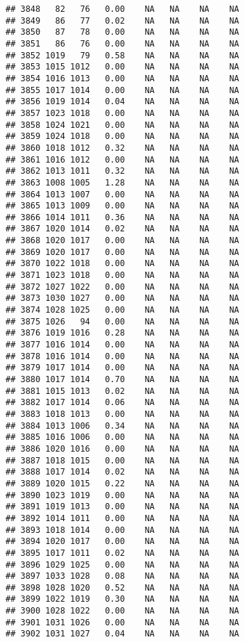 \documentclass{article}\usepackage{graphicx, color}
\makeatletter
\newenvironment{kframe}{%
 \def\at@end@of@kframe{}%
 \ifinner\ifhmode%
  \def\at@end@of@kframe{\end{minipage}}%
  \begin{minipage}{\columnwidth}%
 \fi\fi%
 \def\FrameCommand##1{\hskip\@totalleftmargin \hskip-\fboxsep
 \colorbox{shadecolor}{##1}\hskip-\fboxsep
     \hskip-\linewidth \hskip-\@totalleftmargin \hskip\columnwidth}%
 \MakeFramed {\advance\hsize-\width
   \@totalleftmargin\z@ \linewidth\hsize
   \@setminipage}}%
 {\par\unskip\endMakeFramed%
 \at@end@of@kframe}
\newenvironment{knitrout}{}{} %
\makeatother
\begin{document}
\begin{knitrout}
\begin{kframe}
\begin{verbatim}
## 3848   82   76   0.00    NA   NA    NA    NA
## 3849   86   77   0.02    NA   NA    NA    NA
## 3850   87   78   0.00    NA   NA    NA    NA
## 3851   86   76   0.00    NA   NA    NA    NA
## 3852 1019   79   0.58    NA   NA    NA    NA
## 3853 1015 1012   0.00    NA   NA    NA    NA
## 3854 1016 1013   0.00    NA   NA    NA    NA
## 3855 1017 1014   0.00    NA   NA    NA    NA
## 3856 1019 1014   0.04    NA   NA    NA    NA
## 3857 1023 1018   0.00    NA   NA    NA    NA
## 3858 1024 1021   0.00    NA   NA    NA    NA
## 3859 1024 1018   0.00    NA   NA    NA    NA
## 3860 1018 1012   0.32    NA   NA    NA    NA
## 3861 1016 1012   0.00    NA   NA    NA    NA
## 3862 1013 1011   0.32    NA   NA    NA    NA
## 3863 1008 1005   1.28    NA   NA    NA    NA
## 3864 1013 1007   0.00    NA   NA    NA    NA
## 3865 1013 1009   0.00    NA   NA    NA    NA
## 3866 1014 1011   0.36    NA   NA    NA    NA
## 3867 1020 1014   0.02    NA   NA    NA    NA
## 3868 1020 1017   0.00    NA   NA    NA    NA
## 3869 1020 1017   0.00    NA   NA    NA    NA
## 3870 1022 1018   0.00    NA   NA    NA    NA
## 3871 1023 1018   0.00    NA   NA    NA    NA
## 3872 1027 1022   0.00    NA   NA    NA    NA
## 3873 1030 1027   0.00    NA   NA    NA    NA
## 3874 1028 1025   0.00    NA   NA    NA    NA
## 3875 1026   94   0.00    NA   NA    NA    NA
## 3876 1019 1016   0.28    NA   NA    NA    NA
## 3877 1016 1014   0.00    NA   NA    NA    NA
## 3878 1016 1014   0.00    NA   NA    NA    NA
## 3879 1017 1014   0.00    NA   NA    NA    NA
## 3880 1017 1014   0.70    NA   NA    NA    NA
## 3881 1015 1013   0.02    NA   NA    NA    NA
## 3882 1017 1014   0.06    NA   NA    NA    NA
## 3883 1018 1013   0.00    NA   NA    NA    NA
## 3884 1013 1006   0.34    NA   NA    NA    NA
## 3885 1016 1006   0.00    NA   NA    NA    NA
## 3886 1020 1016   0.00    NA   NA    NA    NA
## 3887 1018 1015   0.00    NA   NA    NA    NA
## 3888 1017 1014   0.02    NA   NA    NA    NA
## 3889 1020 1015   0.22    NA   NA    NA    NA
## 3890 1023 1019   0.00    NA   NA    NA    NA
## 3891 1019 1013   0.00    NA   NA    NA    NA
## 3892 1014 1011   0.00    NA   NA    NA    NA
## 3893 1018 1014   0.00    NA   NA    NA    NA
## 3894 1020 1017   0.00    NA   NA    NA    NA
## 3895 1017 1011   0.02    NA   NA    NA    NA
## 3896 1029 1025   0.00    NA   NA    NA    NA
## 3897 1033 1028   0.08    NA   NA    NA    NA
## 3898 1028 1020   0.52    NA   NA    NA    NA
## 3899 1022 1019   0.30    NA   NA    NA    NA
## 3900 1028 1022   0.00    NA   NA    NA    NA
## 3901 1031 1026   0.00    NA   NA    NA    NA
## 3902 1031 1027   0.04    NA   NA    NA    NA

\end{verbatim}
\end{kframe}
\end{knitrout}
\end{document}
